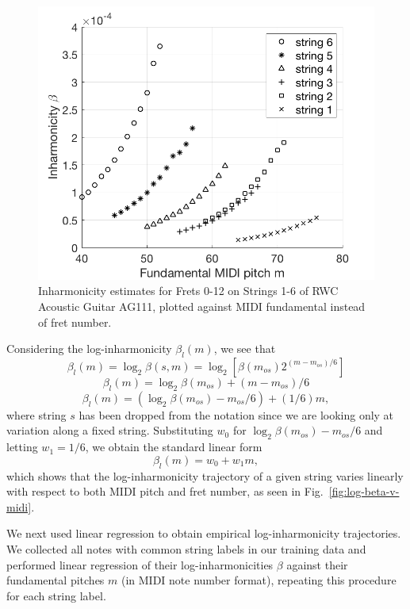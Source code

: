 \documentclass[convention,peer-reviewed]{aesconf}
\begin{document}
\begin{figure}[!t] 
\centering
\includegraphics[scale=0.25]{beta-v-midi}
\caption{Inharmonicity estimates for Frets 0-12 on Strings 1-6 of RWC Acoustic Guitar AG111, plotted against MIDI fundamental instead of fret number.}
\label{fig:beta-v-midi}
\end{figure}

Considering  the log-inharmonicity $\beta_{l}(m)$, we see that
\begin{equation}
\beta_l(m) = \log_2\beta(s,m) = \log_2[\beta(m_{os})2^{(m-m_{os})/6}]
\end{equation}
\begin{equation}
\beta_l(m) = \log_2\beta(m_{os}) + (m-m_{os})/6
\end{equation}
\begin{equation}
\beta_l(m) = (\log_2\beta(m_{os})-m_{os}/6) + (1/6)m,
\end{equation}
where string $s$ has been dropped from the notation since we are looking only at variation along a fixed string. Substituting $w_0$ for $\log_2\beta(m_{os})-m_{os}/6$ and letting $w_1 = 1/6$, we obtain the standard linear form
\begin{equation}
\label{eq:linear-traj}
\beta_l(m) = w_0 + w_1m,
\end{equation}
which shows that the log-inharmonicity trajectory of a given string varies linearly with respect to both MIDI pitch and fret number, as seen in Fig.~\ref{fig:log-beta-v-midi}.

We next used linear regression to obtain empirical log-inharmonicity trajectories. We collected all notes with common string labels in our training data and performed linear regression of their log-inharmonicities $\beta$ against their fundamental pitches $m$ (in MIDI note number format), repeating  this procedure  for each string label. 
\end{document}
